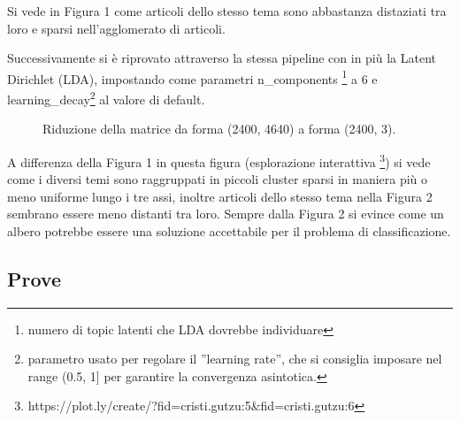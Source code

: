 \documentclass[runningheads]{llncs}
\begin{document}
Si vede in Figura 1 come articoli dello stesso tema sono abbastanza distaziati tra loro e sparsi nell'agglomerato di
articoli.\par

\qquad
\qquad




Successivamente si \`e riprovato attraverso la stessa pipeline con in pi\`u la Latent Dirichlet (LDA), impostando come parametri n\_components \footnote{numero di topic latenti che LDA dovrebbe individuare} a 6 e learning\_decay\footnote{parametro usato per regolare il ''learning rate'', che si consiglia imposare nel range (0.5, 1] per garantire la convergenza asintotica.} al valore di default.



\begin{figure}%
    \centering
    \qquad
    \caption{Riduzione della matrice da forma (2400, 4640) a forma (2400, 3). }%
    \label{fig:tsne2}%
\end{figure}


A differenza della Figura 1 in questa figura (esplorazione interattiva
\footnote{https://plot.ly/create/?fid=cristi.gutzu:5\&fid=cristi.gutzu:6}) si vede come i diversi temi sono raggruppati in piccoli cluster sparsi in maniera pi\`u o meno uniforme lungo i tre assi, inoltre articoli dello stesso tema nella Figura 2 sembrano essere meno distanti tra loro. Sempre dalla Figura 2 si evince come un albero potrebbe essere una soluzione accettabile per il problema di classificazione.

\subsection{Prove}
\end{document}
